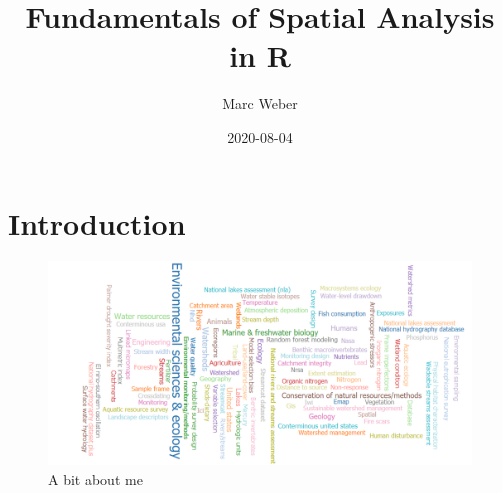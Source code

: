 \documentclass[
]{book}
\title{Fundamentals of Spatial Analysis in R}
\author{Marc Weber}
\date{2020-08-04}
\begin{document}
\maketitle

{
\setcounter{tocdepth}{1}
\tableofcontents
}
\hypertarget{intro}{%
\chapter{Introduction}\label{intro}}

\begin{figure}
\includegraphics[width=1\linewidth]{images/WordCloud} \caption{A bit about me}\label{fig:unnamed-chunk-1}
\end{figure}
\end{document}
